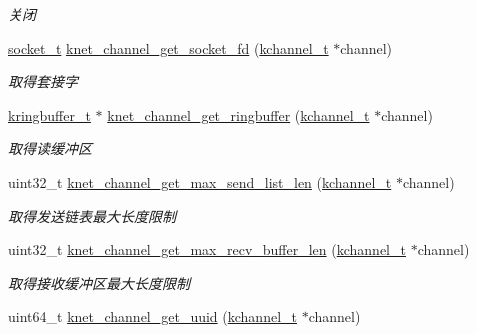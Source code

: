 \begin{DoxyCompactItemize}
\begin{DoxyCompactList}\small\item\em 关闭 \end{DoxyCompactList}\item 
\hyperlink{a00066_a0d9e0afbf02fb6ed6c5b1415dce51b05_a0d9e0afbf02fb6ed6c5b1415dce51b05}{socket\+\_\+t} \hyperlink{a00061_aac1ff10cb6b113a65e108e4c7422c149_aac1ff10cb6b113a65e108e4c7422c149}{knet\+\_\+channel\+\_\+get\+\_\+socket\+\_\+fd} (\hyperlink{a00066_aca9cd34897582aa9969245a93cc62fb5_aca9cd34897582aa9969245a93cc62fb5}{kchannel\+\_\+t} $\ast$channel)
\begin{DoxyCompactList}\small\item\em 取得套接字 \end{DoxyCompactList}\item 
\hyperlink{a00066_a66d91f7667db1f0b2983fc25e1a20f1c_a66d91f7667db1f0b2983fc25e1a20f1c}{kringbuffer\+\_\+t} $\ast$ \hyperlink{a00061_ad289fcea4095b519b0ced40cfb89f693_ad289fcea4095b519b0ced40cfb89f693}{knet\+\_\+channel\+\_\+get\+\_\+ringbuffer} (\hyperlink{a00066_aca9cd34897582aa9969245a93cc62fb5_aca9cd34897582aa9969245a93cc62fb5}{kchannel\+\_\+t} $\ast$channel)
\begin{DoxyCompactList}\small\item\em 取得读缓冲区 \end{DoxyCompactList}\item 
uint32\+\_\+t \hyperlink{a00061_a26e5ba64b710a168b780e2b845ba3cca_a26e5ba64b710a168b780e2b845ba3cca}{knet\+\_\+channel\+\_\+get\+\_\+max\+\_\+send\+\_\+list\+\_\+len} (\hyperlink{a00066_aca9cd34897582aa9969245a93cc62fb5_aca9cd34897582aa9969245a93cc62fb5}{kchannel\+\_\+t} $\ast$channel)
\begin{DoxyCompactList}\small\item\em 取得发送链表最大长度限制 \end{DoxyCompactList}\item 
uint32\+\_\+t \hyperlink{a00061_aba9f33720ab9f2d3ae59a75cf4f7841a_aba9f33720ab9f2d3ae59a75cf4f7841a}{knet\+\_\+channel\+\_\+get\+\_\+max\+\_\+recv\+\_\+buffer\+\_\+len} (\hyperlink{a00066_aca9cd34897582aa9969245a93cc62fb5_aca9cd34897582aa9969245a93cc62fb5}{kchannel\+\_\+t} $\ast$channel)
\begin{DoxyCompactList}\small\item\em 取得接收缓冲区最大长度限制 \end{DoxyCompactList}\item 
uint64\+\_\+t \hyperlink{a00061_a232548ee5a65b9cdcd0475cefe8f9095_a232548ee5a65b9cdcd0475cefe8f9095}{knet\+\_\+channel\+\_\+get\+\_\+uuid} (\hyperlink{a00066_aca9cd34897582aa9969245a93cc62fb5_aca9cd34897582aa9969245a93cc62fb5}{kchannel\+\_\+t} $\ast$channel)

\end{DoxyCompactItemize}
